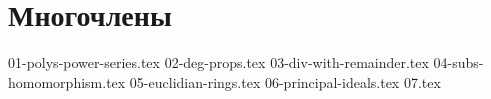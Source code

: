 \section{Многочлены}
{01-polys-power-series.tex}
{02-deg-props.tex}
{03-div-with-remainder.tex}
{04-subs-homomorphism.tex}
{05-euclidian-rings.tex}
{06-principal-ideals.tex}
{07.tex}
